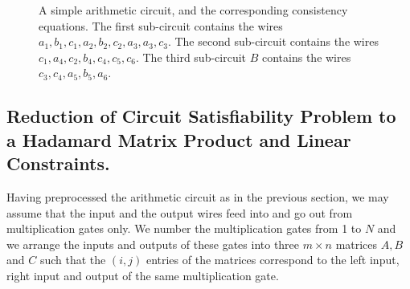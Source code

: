 \begin{figure}
{
}
\vspace{-.2cm}
\caption{A simple arithmetic circuit, and the corresponding consistency equations. The first sub-circuit contains the wires $a_1,b_1,c_1,a_2,b_2,c_2,a_3,a_3,c_3$. The second sub-circuit contains the wires $c_1,a_4, c_2,b_4,c_4, c_5,c_6$. The third sub-circuit $B$ contains the wires $c_3,c_4,a_5,b_5,a_6$.}
\label{fig:digraph} 
\end{figure}

\subsection{Reduction of Circuit Satisfiability Problem to a Hadamard Matrix Product and Linear Constraints.}
Having preprocessed the arithmetic circuit as in the previous section, we may assume that the input and the output wires feed into and go out from multiplication gates only.
We number the multiplication gates from 1 to $N$ and we arrange the inputs and outputs of these gates into three $m\times n$ matrices $A,B$ and $C$ such that the $(i,j)$ entries of the matrices correspond to the left input, right input and output of the same multiplication gate.

